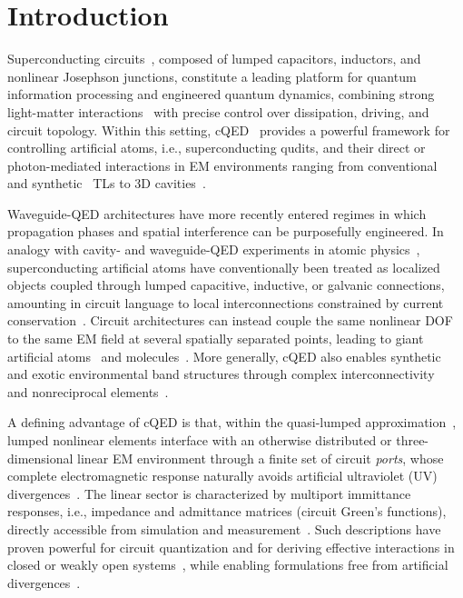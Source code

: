 \documentclass[prx,aps,twocolumn,article]{revtex4-2}
\begin{document}
\section{Introduction}
Superconducting circuits~\cite{Devoret:2013}, composed of lumped capacitors, inductors, and nonlinear Josephson junctions, constitute a leading platform
for quantum information processing and engineered quantum dynamics, combining strong light-matter interactions~\cite{Devoret:2007,FornDiaz:2010,Niemczyk:2010} with precise control over dissipation, driving, and circuit topology. Within this setting, \gls{cQED}~\cite{Blais:2021} provides a powerful framework for controlling artificial atoms, i.e., superconducting qudits, and their direct
or photon-mediated interactions in \gls{EM} environments ranging from conventional~\cite{Blais:2004} and synthetic~\cite{Egger:2013,Mirhosseini:2018}
\gls{TLs} to 3D cavities~\cite{Paik:2011}.

Waveguide-QED architectures have more recently entered regimes in which propagation phases and spatial interference can be purposefully engineered. In analogy with cavity- and waveguide-QED experiments in atomic physics~\cite{Berman:1994,Raimond:2001,Sheremet:2023}, superconducting artificial atoms have conventionally been treated as localized objects coupled through lumped capacitive, inductive, or galvanic connections,
amounting in circuit language to local interconnections constrained by current conservation~\cite{Chua:1974}. Circuit architectures can instead couple the same nonlinear \gls{DOF} to the same \gls{EM} field at several
spatially separated points, leading to giant artificial
atoms~\cite{Gustafsson:2014,Kockum:2014,kannan:2020} and
molecules~\cite{Gheeraert:2020,Yin:2022,TLevy-Yeyati:2026}. More generally, \gls{cQED} also enables synthetic and exotic environmental band structures through complex interconnectivity~\cite{Kim:2021} and nonreciprocal
elements~\cite{Koch:2010,Kamal:2011,Kerckhoff:2015,Chapman:2017,Barzanjeh:2017,Caloz:2018}.

A defining advantage of \gls{cQED} is that, within the quasi-lumped approximation~\cite{Pozar:2009,Nigg:2012,Solgun:2015,MinevQL-Models:2021,ParraRodriguez:2025}, lumped nonlinear elements interface with an otherwise distributed or three-dimensional linear \gls{EM} environment through a finite set of circuit \emph{ports}, whose complete electromagnetic response naturally avoids artificial ultraviolet (UV) divergences~\cite{Houck:2008,Filipp:2011,Lalumiere:2013,Kockum:2014}. The linear sector is characterized by multiport immittance responses, i.e., impedance and admittance matrices (circuit Green's functions), directly accessible from simulation and measurement~\cite{Pozar:2009}. Such descriptions have proven powerful for circuit quantization and for deriving effective interactions in closed or weakly open systems~\cite{Nigg:2012,Bergenfeldt:2012,Solgun:2014,Solgun:2015,Mortensen:2016,Hassler:2019,Solgun:2019,Cattaneo:2019,MinevQL-Models:2021,MinevEPR:2021,Solgun:2022,Labarca:2024}, while enabling formulations free from artificial divergences~\cite{Paladino:2003,Bamba:2014,Gely:2017,Malekakhlagh:2017,Solgun:2014,Solgun:2015,ParraRodriguez:2018,ParraRodriguez:2019,ParraRodriguez:2022,ParraRodriguez:2025}.
\end{document}
